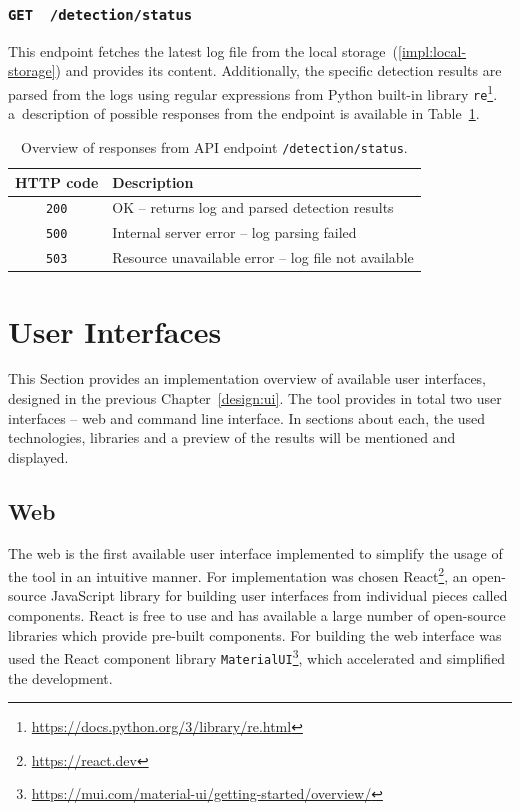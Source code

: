   \subsubsection*{\texttt{GET \ /detection/status}}
  This endpoint fetches the latest log file from the local storage~(\ref{impl:local-storage}) and provides its content.
  Additionally, the specific detection results are parsed from the logs using regular expressions from Python built-in
  library \texttt{re}\footnote{\href{https://docs.python.org/3/library/re.html}{https://docs.python.org/3/library/re.html}}.
  a~description of possible responses from the endpoint is available in Table~\ref{tab:detection-status-rs}.

  \begin{table}[h]
        \centering
        \begin{tabular}{|c|l|}
          \hline
            HTTP code & Description \\
          \hline
            \texttt{200} & OK -- returns log and parsed detection results \\
            \texttt{500} & Internal server error -- log parsing failed \\
            \texttt{503} & Resource unavailable error -- log file not available \\
          \hline
        \end{tabular}
        \caption{Overview of responses from API endpoint \texttt{/detection/status}.}
        \label{tab:detection-status-rs}
    \end{table}

  \section{User Interfaces}
  This Section provides an implementation overview of available user interfaces, designed in the previous Chapter~\ref{design:ui}.
  The tool provides in total two user interfaces -- web and command line interface. In sections about each, the used technologies,
  libraries and a preview of the results will be mentioned and displayed.

  \subsection*{Web}
  The web is the first available user interface implemented to simplify the usage of the tool in an intuitive manner. For implementation
  was chosen React\footnote{\href{https://react.dev}{https://react.dev}}, an open-source JavaScript library for building user
  interfaces from individual pieces called components. React is free to use and has available a large number of open-source
  libraries which provide pre-built components. For building the web interface was used the React component library
  \texttt{MaterialUI}\footnote{\href{https://mui.com/material-ui/getting-started/overview/}
  {https://mui.com/material-ui/getting-started/overview/}}, which accelerated and simplified the development.

